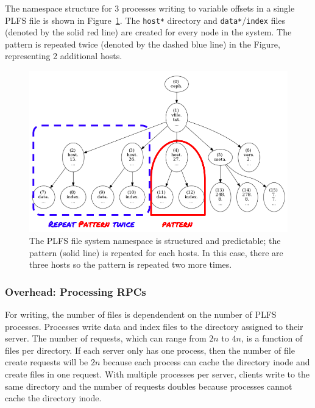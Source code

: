 The namespace structure for 3 processes writing to variable offsets in a single
PLFS file is shown in Figure~\ref{fig:tree_plfs}. The \texttt{host*} directory
and \texttt{data*}/\texttt{index} files (denoted by the solid red line) are
created for every node in the system. The pattern is repeated twice (denoted by
the dashed blue line) in the Figure, representing 2 additional hosts.

\begin{figure}[tb]
\centering
  \includegraphics[width=1\linewidth]{figures/tree_plfs.png} 
  \caption{The PLFS file system namespace is structured and predictable; the
  pattern (solid line) is repeated for each hosts. In this case, there are three
  hosts so the pattern is repeated two more times. 
  }\label{fig:tree_plfs}
\end{figure}

\subsubsection{Overhead: Processing RPCs}

For writing, the number of files is dependendent on the number of PLFS
processes. Processes write data and index files to the directory assigned to
their server. The number of requests, which can range from \(2n\) to \(4n\), is
a function of files per directory.  If each server only has one process, then
the number of file create requests will be \(2n\) because each process can
cache the directory inode and create files in one request. With multiple
processes per server, clients write to the same directory and the number of
requests doubles because processes cannot cache the directory inode.

